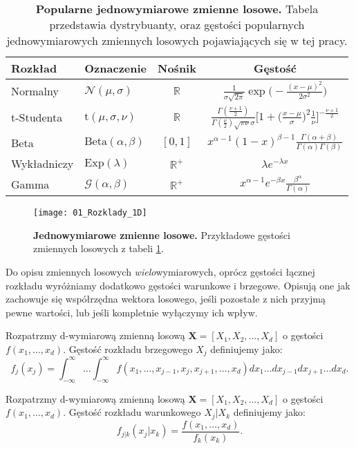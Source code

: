 \begin{table}[h]
	\caption{\textbf{Popularne jednowymiarowe zmienne losowe.} Tabela przedstawia dystrybuanty, oraz gęstości popularnych jednowymiarowych zmiennych losowych pojawiających się w tej pracy.}
	\label{tab:przykladowe_zmienne_losowe}
	\centering
	\begin{tabular}{ll|c|c}
		\hline
		\textbf{Rozkład} & \textbf{Oznaczenie} & \textbf{Nośnik} & \textbf{Gęstość} \\
		\hline
		Normalny & $\mathcal{N}(\mu, \sigma)$ & $\mathbb{R}$ & $\frac{1}{\sigma \sqrt{2 \pi}} \exp\big(-\frac{(x-\mu)^2}{2\sigma^2}\big)$\\ 
		t-Studenta & $\text{t}(\mu, \sigma, \nu)$ & $\mathbb{R}$ & $ \frac{\Gamma(\frac{\nu + 1}{2})}{\Gamma(\frac{\nu}{2})\sqrt{\pi\nu}\sigma} \bigg[1 + \big(\frac{x - \mu}{\sigma}\big)^2\frac{1}{\nu}\bigg]^{-\frac{\nu + 1}{2}} $ \\ 
		Beta & $\text{Beta}(\alpha, \beta)$ & $[0, 1]$ & $ x^{\alpha - 1}(1 - x)^{\beta - 1}\frac{\Gamma(\alpha + \beta)}{\Gamma(\alpha)\Gamma(\beta)}$ \\ 
		Wykładniczy & $\text{Exp}(\lambda)$ & $\mathbb{R}^{+}$ & $ \lambda e^{-\lambda x}$ \\
		Gamma & $\mathcal{G}(\alpha, \beta)$ & $\mathbb{R}^+$ & $x^{\alpha - 1}e^{-\beta x}\frac{\beta^\alpha}{\Gamma(\alpha)}$\\ 
		
		\hline
	\end{tabular}
\end{table}

\begin{figure}[H]
	\centering
	\texttt{[image: 01\_Rozklady\_1D]}
	\caption{\textbf{Jednowymiarowe zmienne losowe.} Przykładowe gęstości zmiennych losowych z tabeli \ref{tab:przykladowe_zmienne_losowe}.\label{fig:przykladowe_zmienne_losowe}}
\end{figure}

Do opisu zmiennych losowych \emph{wielo}wymiarowych, oprócz gęstości łącznej rozkładu wyróżniamy dodatkowo gęstości warunkowe i brzegowe. Opisują one jak zachowuje się współrzędna wektora losowego, jeśli pozostałe z nich przyjmą pewne wartości, lub jeśli kompletnie wyłączymy ich wpływ.

\begin{df}
	Rozpatrzmy d-wymiarową zmienną losową $\mathbf{X} = [X_1, X_2, \dots, X_d]$ o gęstości $f(x_1, \dots, x_d)$. Gęstość rozkładu brzegowego $X_j$ definiujemy jako:
	$$f_j(x_j)=\int_{-\infty}^{\infty}\dots\int_{-\infty}^{\infty} f(x_1, \dots, x_{j-1}, x_j, x_{j+1}, \dots, x_d)  dx_1\dots dx_{j-1} dx_{j+1} \dots dx_d.$$
\end{df}

\begin{df}
	Rozpatrzmy d-wymiarową zmienną losową $\mathbf{X} = [X_1, X_2, \dots, X_d]$ o gęstości $f(x_1, \dots, x_d)$. Gęstość rozkładu warunkowego $X_j \vert X_k$ definiujemy jako:
	$$f_{j|k}(x_j|x_k) = \frac{f(x_1, \dots, x_d)}{f_k(x_k)}.$$
\end{df}
